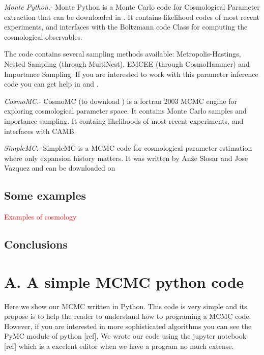 \documentclass[onecolumn,           %
               showpacs,            %
               preprintnumbers,     %
               aps,                 %
               prl,          	    %
               letterpaper,             %
               superscriptaddress,      %
               nofootinbib,         %
               tightenlines,        %
               floats,floatfix      %
               ,usenatbib,
               ]{revtex4-1}
\begin{document}
\textit{Monte Python}.-
Monte Python is a Monte Carlo code for Cosmological Parameter extraction  that can be downloaded in \cite{MP1}. It contains likelihood codes of most recent experiments, and interfaces with the Boltzmann code Class for computing the cosmological observables.

The code contains several sampling methods available: Metropolis-Hastings, Nested Sampling (through MultiNest), EMCEE (through CosmoHammer) and Importance Sampling. If you are interested to work with this parameter inference code you can get help in \cite{mont1} and \cite{MP2}.

\textit{CosmoMC}.- CosmoMC (to download \cite{cosmomc}) is a fortran 2003 MCMC engine for exploring cosmological parameter space. It contains Monte Carlo samples and inportance sampling. It containg likelihoods of most recent experiments, and interfaces with CAMB.

\textit{SimpleMC}.- SimpleMC is a MCMC code for cosmological parameter estimation where only expansion history matters. It was written by Anže Slosar and Jose Vazquez and can be downloaded on \cite{simplemc}

\subsection{Some examples}
\textcolor{red}{Examples of cosmology}
\subsection{Conclusions}
\appendix
\section{A. A simple MCMC python code}

Here we show our MCMC written in Python. This code is very simple and its propose is to help the reader to understand how to programing a MCMC code. However, if you are interested in more sophisticated algorithms you can see the PyMC module of python [ref]. We wrote our code using the jupyter notebook [ref] which is a excelent editor when we have a program no much extense.  
\end{document}
